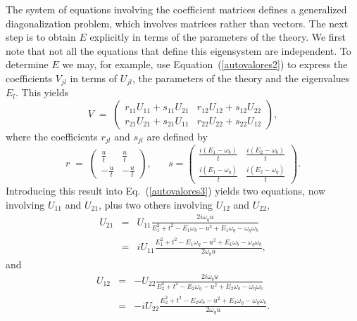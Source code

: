\documentclass[a4paper,12pt]{article}
\newcommand{\n}{\eta}
\newcommand{\w}{\omega}
\begin{document}
The system of equations involving the coefficient matrices defines a
generalized diagonalization problem, which involves matrices rather
than vectors. The next step is to obtain $E$ explicitly in terms of
the parameters of the theory.  We first note that not all the
equations that define this eigensystem are independent. To determine
$E$ we may, for example, use Equation~(\ref{autovalores2}) to express
the coefficients $V_{jl}$ in terms of $U_{jl}$, the parameters of the
theory and the eigenvalues $E_l$. This yields
\begin{equation}\label{Vjl}
V\;=\; \left(
\begin{array}{cc}
r_{11}U_{11}+s_{11}U_{21} & r_{12}U_{12}+s_{12}U_{22}\\
r_{21}U_{21}+s_{21}U_{11} & r_{22}U_{22}+s_{22}U_{12}
\end{array}
\right),
\end{equation}
where the coefficients $r_{jl}$ and $s_{jl}$ are defined by
\begin{equation}
r\;=\; \left(
\begin{array}{cc}
  \frac{u}{t} & \frac{u}{t} \\
  -\frac{u}{t} & -\frac{u}{t}
\end{array}
\right), \;\;\;\;\;\; s= \left(
\begin{array}{cc}
  \frac{i(E_1-\w_b)}{t} & \frac{i(E_2-\w_b)}{t} \\
  \frac{i(E_1-\w_\n)}{t} & \frac{i(E_2-\w_\n)}{t}
\end{array}
\right).
\end{equation}
Introducing this result into Eq.~(\ref{autovalores3}) yields two
equations, now involving $U_{11}$ and $U_{21}$, plus two others
involving $U_{12}$ and $U_{22}$,
\begin{eqnarray}\label{U11}
U_{21} &=& U_{11} \frac{2 i \w_\n u}{E_1^2+t^2-E_1 \w_b-u^2+E_1\w_\n-\w_\n \w_b} \nonumber\\
&=&i U_{11} \frac{E_1^2+t^2-E_1 \w_\n-u^2+E_1\w_b-\w_\n \w_b}{2\w_b u},
\end{eqnarray}
and
\begin{eqnarray}\label{U22}
U_{12}&=&-U_{22}\frac{2 i \w_b u}{E_2^2+t^2-E_2 \w_\n-u^2+E_2\w_b-\w_\n \w_b} \nonumber\\
&=&- i U_{22} \frac{E_2^2+t^2-E_2 \w_b-u^2+E_2\w_\n-\w_\n \w_b}{2\w_\n u}.
\end{eqnarray}
\end{document}
